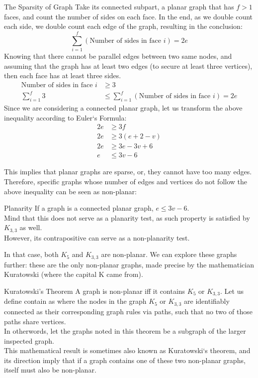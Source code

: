 \begin{ln-theorem}{The Sparsity of Graph}{}
    Take its connected subpart, a planar graph that has $f > 1$ faces, and count the number of sides on each face. In the end, as we double count each side, we double count each edge of the graph, resulting in the conclusion:
    \[\sum_{i = 1}^f (\text{Number of sides in face $i$}) = 2e\]
    Knowing that there cannot be parallel edges between two same nodes, and assuming that the graph has at least two edges (to secure at least three vertices), then each face has at least three sides. \\
    \begin{align*}
        \text{Number of sides in face $i$} &\geq 3 \\
        \sum_{i = 1}^f 3 &\leq \sum_{i = 1}^f (\text{Number of sides in face $i$}) = 2e
    \end{align*}
    Since we are considering a connected planar graph, let us transform the above inequality according to Euler`s Formula:
    \begin{align*}
        2e &\geq 3f \\
        2e &\geq 3(e + 2 - v) \\
        2e &\geq 3e - 3v + 6 \\
        e &\leq 3v - 6
    \end{align*}
\end{ln-theorem}
This implies that planar graphs are sparse, or, they cannot have too many edges. \\
Therefore, specific graphs whose number of edges and vertices do not follow the above inequality can be seen as non-planar:
\begin{ln-define}{Planarity}{}
    If a graph is a connected planar graph, $e \leq 3v - 6$. \\
    Mind that this does not serve as a planarity test, as such property is satisfied by $K_{3, 3}$ as well. \\
    However, its contrapositive can serve as a non-planarity test.
\end{ln-define}
In that case, both $K_5$ and $K_{3,3}$ are non-planar. We can explore these graphs further: these are the only non-planar graphs, made precise by the mathematician Kuratowski (where the capital K came from).
\begin{ln-theorem}{Kuratowski's Theorem}{}
    A graph is non-planar iff it contains $K_5$ or $K_{3,3}$.
    \tcblower
    Let us define contain as where the nodes in the graph $K_5$ or $K_{3,3}$ are identifiably connected as their corresponding graph rules via paths, such that no two of those paths share vertices. \\
    In otherwords, let the graphs noted in this theorem be a subgraph of the larger inspected graph. \\
    This mathematical result is sometimes also known as Kuratowski`s theorem, and its direction imply that if a graph contains one of these two non-planar graphs, itself must also be non-planar.
\end{ln-theorem}

